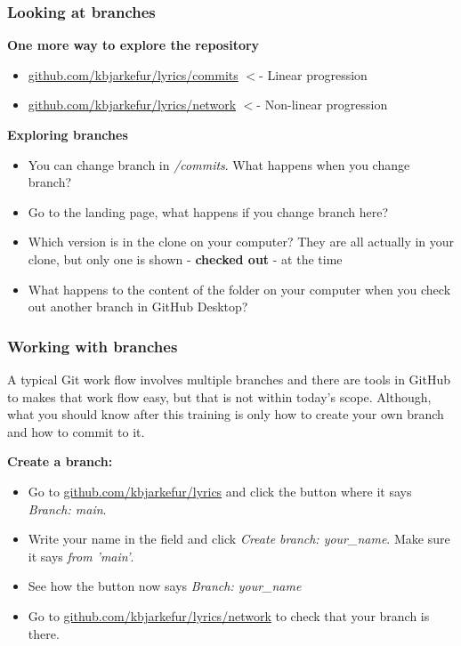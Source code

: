 \documentclass[aspectratio=169]{beamer} %
\newcommand{\trainingURL}[1]{{\color{blue}\url{#1}}}
\newcommand{\traininerUsername}{kbjarkefur}
\newcommand{\repoName}{\traininerUsername/lyrics}
\newcommand{\trainingRepoURL}[1]{\trainingURL{github.com/\repoName #1}}
\begin{document}
\begin{frame}
\frametitle{Looking at branches}


	\textbf{One more way to explore the repository}
	\begin{itemize}
		\item \trainingRepoURL{/commits} $<$- Linear progression
		\item \trainingRepoURL{/network} $<$- Non-linear progression
	\end{itemize}

	\vspace{.1cm}

	\textbf{Exploring branches}
	\begin{itemize}
		\item You can change branch in \textit{/commits}. What happens when you change branch?
		\item Go to the landing page, what happens if you change branch here?
		\item Which version is in the clone on your computer? They are all actually in your clone, but only one is shown - \textbf{checked out} - at the time
		\item What happens to the content of the folder on your computer when you check out another branch in GitHub Desktop?
	\end{itemize}

\end{frame}

\begin{frame}
\frametitle{Working with branches}

	A typical Git work flow involves multiple branches and there are tools in GitHub to makes that work flow easy, but that is not within today's scope. Although, what you should know after this training is only how to create your own branch and how to commit to it.

	\textbf{Create a branch:}
	\begin{itemize}
		\item Go to \trainingRepoURL{} and click the button where it says \textit{Branch: main}.
		\item Write your name in the field and click \textit{Create branch: your\_name}. Make sure it says \textit{from 'main'}.
		\item See how the button now says \textit{Branch: your\_name}
		\item Go to \trainingRepoURL{/network} to check that your branch is there.
	\end{itemize}

\end{frame}
\end{document}

